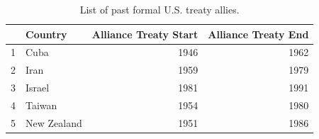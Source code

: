 \documentclass[12pt]{article}
\begin{document}
\begin{table}[ht]
\centering
\begin{tabular}{rlrr}
  \hline
 & Country & Alliance Treaty Start & Alliance Treaty End \\ 
  \hline
1 & Cuba & 1946 & 1962 \\ 
  2 & Iran & 1959 & 1979 \\ 
  3 & Israel & 1981 & 1991 \\ 
  4 & Taiwan & 1954 & 1980 \\ 
  5 & New Zealand & 1951 & 1986 \\ 
   \hline
\end{tabular}
\caption{List of past formal U.S. treaty allies.} 
\label{tab:us-oldally-list}
\end{table}



\newpage
\singlespace


\end{document}

